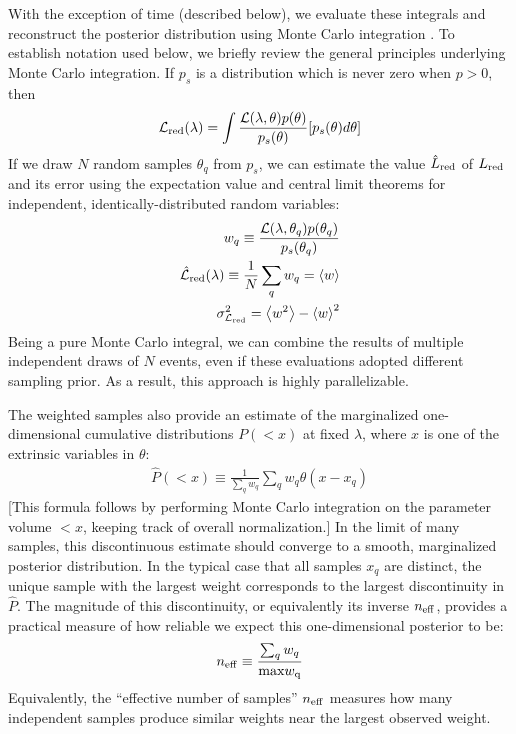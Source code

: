 With the exception of time (described below), we evaluate these integrals and reconstruct the posterior distribution using Monte Carlo integration
\cite{book-mm-NumericalRecipies,peter1978new}.   To establish notation used below, we briefly review the general principles  underlying Monte Carlo
integration.  If $p_s$ is a distribution which is never zero when $p>0$, then 
\begin{eqnarray}
{\cal L}_{\rm red}(\lambda) = \int \frac{{\cal L}(\lambda,\theta) p(\theta)}{p_s(\theta)} [p_s(\theta) d\theta]
\end{eqnarray}
% 
If we draw $N$ random samples $\theta_q$ from $p_s$, we can estimate the value $\hat{L}_{\rm red}$ of $L_{\rm red}$ and its error using the
expectation value and central limit theorems for independent, identically-distributed random variables:
\begin{eqnarray}
w_q \equiv \frac{{\cal L}(\lambda,\theta_q) p(\theta_q)}{p_s(\theta_q)} \\
\hat{{\cal L}}_{\rm red}(\lambda) \equiv \frac{1}{N} \sum_q w_q = \left<w\right> \\
\sigma_{{\cal L}_{\rm red}}^2 = \left<w^2\right> - \left<w\right>^2
\end{eqnarray}
Being a pure Monte Carlo integral, we can  combine the results of multiple independent draws of $N$ events, even if these
evaluations adopted different sampling prior.  As a result, this approach is highly parallelizable.  


The weighted samples also provide an estimate of the marginalized one-dimensional cumulative distributions $P(<x)$ at
fixed $\lambda$, where $x$ is one of the extrinsic variables in $\theta$:
\begin{eqnarray}
\hat{P}(<x) \equiv \frac{1}{\sum_q w_q} \sum_q w_q \theta(x-x_q)
\end{eqnarray}
[This formula follows by performing Monte Carlo integration on the parameter volume $<x$, keeping track of overall
  normalization.]  
In the limit of many samples, this discontinuous estimate should converge to a smooth, marginalized posterior distribution.  
In the typical case that all samples $x_q$ are distinct, the unique sample with the largest weight corresponds to the
largest discontinuity in $\hat{P}$.  The magnitude of this discontinuity, or equivalently its inverse $n_{\rm eff}$,
provides a practical measure of how reliable we expect this one-dimensional posterior to be:
\begin{eqnarray}
n_{\rm eff} \equiv \frac{\sum_q w_q}{\text{max} w_{\rm q}}
\end{eqnarray}
Equivalently, the ``effective number of samples'' $n_{\rm eff}$ measures how many independent samples produce similar
weights near the largest observed weight.  



